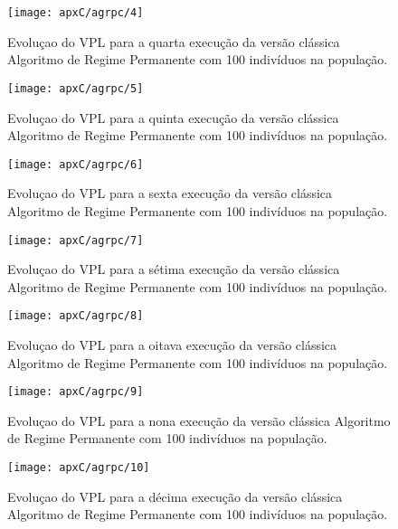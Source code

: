 \begin{figure}[H]
\centering
\texttt{[image: apxC/agrpc/4]}
\caption{Evoluçao do VPL para a quarta execução da versão clássica Algoritmo de Regime Permanente com 100 indivíduos na população.}
\label{fig:graphRPC3-04}
\end{figure}

\begin{figure}[H]
\centering
\texttt{[image: apxC/agrpc/5]}
\caption{Evoluçao do VPL para a quinta execução da versão clássica Algoritmo de Regime Permanente com 100 indivíduos na população.}
\label{fig:graphRPC3-05}
\end{figure}

\begin{figure}[H]
\centering
\texttt{[image: apxC/agrpc/6]}
\caption{Evoluçao do VPL para a sexta execução da versão clássica Algoritmo de Regime Permanente com 100 indivíduos na população.}
\label{fig:graphRPC3-06}
\end{figure}

\begin{figure}[H]
\centering
\texttt{[image: apxC/agrpc/7]}
\caption{Evoluçao do VPL para a sétima execução da versão clássica Algoritmo de Regime Permanente com 100 indivíduos na população.}
\label{fig:graphRPC3-07}
\end{figure}

\begin{figure}[H]
\centering
\texttt{[image: apxC/agrpc/8]}
\caption{Evoluçao do VPL para a oitava execução da versão clássica Algoritmo de Regime Permanente com 100 indivíduos na população.}
\label{fig:graphRPC3-08}
\end{figure}

\begin{figure}[H]
\centering
\texttt{[image: apxC/agrpc/9]}
\caption{Evoluçao do VPL para a nona execução da versão clássica Algoritmo de Regime Permanente com 100 indivíduos na população.}
\label{fig:graphRPC3-09}
\end{figure}

\begin{figure}[H]
\centering
\texttt{[image: apxC/agrpc/10]}
\caption{Evoluçao do VPL para a décima execução da versão clássica Algoritmo de Regime Permanente com 100 indivíduos na população.}
\label{fig:graphRPC3-10}
\end{figure}